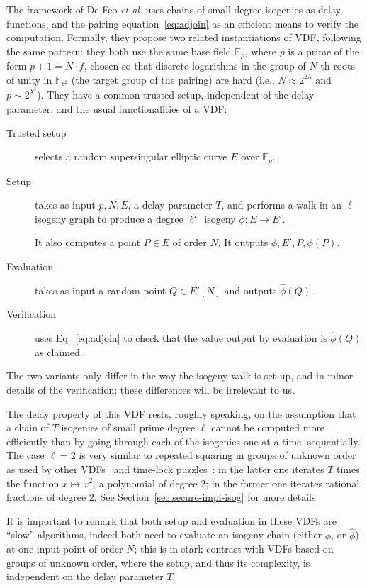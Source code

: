 \documentclass{llncs}
\newcommand{\F}{\mathbb{F}}
\begin{document}
The framework of De Feo \emph{et al.} uses chains of small degree
isogenies as delay functions, and the pairing
equation~\eqref{eq:adjoin} as an efficient means to verify the
computation. %
Formally, they propose two related instantiations of VDF, following
the same pattern: they both use the same base field $\F_p$, where $p$
is a prime of the form $p+1=N\cdot f$, chosen so that discrete
logarithms in the group of $N$-th roots of unity in $\F_{p^2}$ (the
target group of the pairing) are hard (i.e., $N\approx 2^{2\lambda}$
and $p\sim 2^{\lambda^3}$). %
They have a common trusted setup, independent of the delay parameter,
and the usual functionalities of a VDF:
\begin{description}
\item[Trusted setup] selects a random supersingular elliptic curve $E$
  over $\F_p$.
\item[Setup] takes as input $p,N,E$, a delay parameter $T$, and
  performs a walk in an $\ell$-isogeny graph to produce a degree
  $\ell^T$ isogeny $\phi:E\to E'$.
  
  It also computes a point $P\in E$ of order $N$. %
  It  outputs $\phi,E',P,\phi(P)$.
\item[Evaluation] takes as input a random point $Q\in E'[N]$ and outputs
  $\hat\phi(Q)$.
\item[Verification] uses Eq.~\eqref{eq:adjoin} to check that the value
  output by evaluation is $\hat\phi(Q)$ as claimed.
\end{description}

The two variants only differ in the way the isogeny walk is set up,
and in minor details of the verification; these differences will be
irrelevant to us.

The delay property of this VDF rests, roughly speaking, on the
assumption that a chain of $T$ isogenies of small prime degree $\ell$
cannot be computed more efficiently than by going through each of the
isogenies one at a time, sequentially. %
The case $\ell=2$ is very similar to repeated squaring in groups of
unknown order as used by other VDFs~\cite{Wesolowski,Pietrzak} and
time-lock puzzles~\cite{TLP}: in the latter one iterates $T$ times the
function $x\mapsto x^2$, a polynomial of degree $2$; in the former one
iterates rational fractions of degree $2$. %
See Section~\ref{sec:secure-impl-isog} for more details.

It is important to remark that both setup and evaluation in these VDFs
are ``slow'' algorithms, indeed both need to evaluate an isogeny chain
(either $\phi$, or $\hat\phi$) at one input point of order $N$; this
is in stark contrast with VDFs based on groups of unknown order, where
the setup, and thus its complexity, is independent on the delay
parameter $T$.
\end{document}
